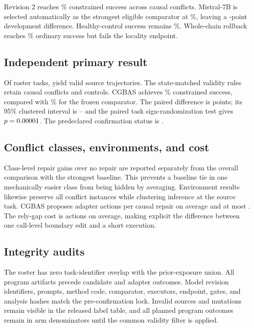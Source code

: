 \documentclass[10pt]{article}
\begin{document}
Revision 2 reaches \DevelopmentMethodRate\% constrained success across
\DevelopmentCausalCount{} causal conflicts. Mistral-7B is selected automatically
as the strongest eligible comparator at \DevelopmentComparatorRate\%, leaving a
\DevelopmentGain{}-point development difference. Healthy-control success remains
\DevelopmentControlRate\%. Whole-chain rollback reaches
\DevelopmentRollbackRate\% ordinary success but fails the locality endpoint.

\subsection{Independent primary result}


Of \ConfirmationRosterCount{} roster tasks, \SuccessfulSourceCount{} yield valid
source trajectories. The state-matched validity rules retain
\ValidCausalCount{} causal conflicts and \ValidControlCount{} controls. CGBAS
achieves \PrimaryMethodRate\% constrained success, compared with
\PrimaryComparatorRate\% for the frozen comparator. The paired difference is
\PrimaryGain{} points; its 95\% clustered interval is
\PrimaryCILow--\PrimaryCIHigh{} and the paired task sign-randomization test gives
$p=0.00001$. The predeclared confirmation status is \ConfirmationStatus{}.

\subsection{Conflict classes, environments, and cost}



Class-level repair gains over no repair are reported separately from the overall
comparison with the strongest baseline. This prevents a baseline tie in one
mechanically easier class from being hidden by averaging. Environment results
likewise preserve all conflict instances while clustering inference at the source
task. CGBAS proposes \MeanAdapterActions{} adapter actions per causal repair on
average and at most \MaxAdapterActions{}. The rely-gap cost is
\MeanRelyAdapterActions{} actions on average, making explicit the difference
between one call-level boundary edit and a short execution.

\subsection{Integrity audits}


The roster has zero task-identifier overlap with the prior-exposure union. All
program artifacts precede candidate and adapter outcomes. Model revision
identifiers, prompts, method code, comparator, executors, endpoint, gates, and
analysis hashes match the pre-confirmation lock. Invalid sources and mutations remain visible in the released
label table, and all planned program outcomes remain in arm denominators until the
common validity filter is applied.
\end{document}

